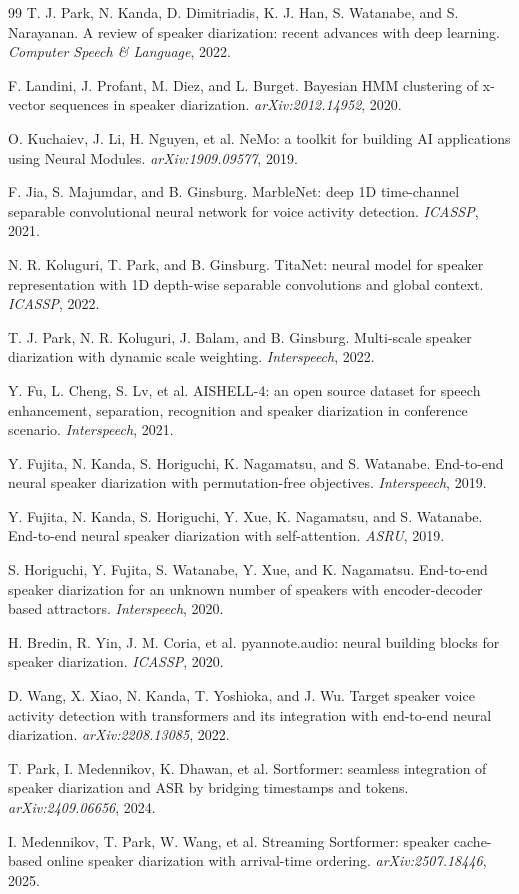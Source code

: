\documentclass[UTF8,a4paper,10pt]{ctexart}
\begin{document}
\newpage
\begin{thebibliography}{99}
T. J. Park, N. Kanda, D. Dimitriadis, K. J. Han, S. Watanabe, and S. Narayanan.
A review of speaker diarization: recent advances with deep learning.
\textit{Computer Speech \& Language}, 2022.

F. Landini, J. Profant, M. Diez, and L. Burget.
Bayesian HMM clustering of x-vector sequences in speaker diarization.
\textit{arXiv:2012.14952}, 2020.

O. Kuchaiev, J. Li, H. Nguyen, et al.
NeMo: a toolkit for building AI applications using Neural Modules.
\textit{arXiv:1909.09577}, 2019.

F. Jia, S. Majumdar, and B. Ginsburg.
MarbleNet: deep 1D time-channel separable convolutional neural network for voice activity detection.
\textit{ICASSP}, 2021.

N. R. Koluguri, T. Park, and B. Ginsburg.
TitaNet: neural model for speaker representation with 1D depth-wise separable convolutions and global context.
\textit{ICASSP}, 2022.

T. J. Park, N. R. Koluguri, J. Balam, and B. Ginsburg.
Multi-scale speaker diarization with dynamic scale weighting.
\textit{Interspeech}, 2022.

Y. Fu, L. Cheng, S. Lv, et al.
AISHELL-4: an open source dataset for speech enhancement, separation, recognition and speaker diarization in conference scenario.
\textit{Interspeech}, 2021.

Y. Fujita, N. Kanda, S. Horiguchi, K. Nagamatsu, and S. Watanabe.
End-to-end neural speaker diarization with permutation-free objectives.
\textit{Interspeech}, 2019.

Y. Fujita, N. Kanda, S. Horiguchi, Y. Xue, K. Nagamatsu, and S. Watanabe.
End-to-end neural speaker diarization with self-attention.
\textit{ASRU}, 2019.

S. Horiguchi, Y. Fujita, S. Watanabe, Y. Xue, and K. Nagamatsu.
End-to-end speaker diarization for an unknown number of speakers with encoder-decoder based attractors.
\textit{Interspeech}, 2020.

H. Bredin, R. Yin, J. M. Coria, et al.
pyannote.audio: neural building blocks for speaker diarization.
\textit{ICASSP}, 2020.

D. Wang, X. Xiao, N. Kanda, T. Yoshioka, and J. Wu.
Target speaker voice activity detection with transformers and its integration with end-to-end neural diarization.
\textit{arXiv:2208.13085}, 2022.

T. Park, I. Medennikov, K. Dhawan, et al.
Sortformer: seamless integration of speaker diarization and ASR by bridging timestamps and tokens.
\textit{arXiv:2409.06656}, 2024.

I. Medennikov, T. Park, W. Wang, et al.
Streaming Sortformer: speaker cache-based online speaker diarization with arrival-time ordering.
\textit{arXiv:2507.18446}, 2025.
\end{thebibliography}
\end{document}
